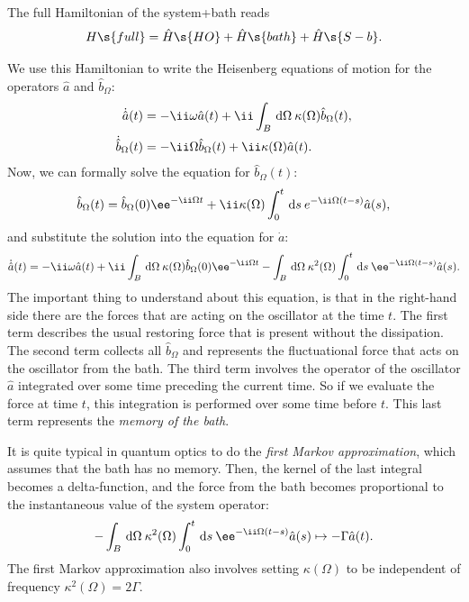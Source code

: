 \documentclass[fontsize=9pt,bookmarkpackage=false]{scrartcl}
\begin{document}
The full Hamiltonian of the system+bath reads
\begin{equation}
  H\s{full} = \hat H\s{HO} + \hat H \s{bath} + \hat H \s{S-b }.
\end{equation}

We use this Hamiltonian to write the Heisenberg equations of motion for the operators $\hat a$ and $\hat b_\Omega$:
\begin{align}
  \dot { \hat a } (t) & = - \ii \omega \hat a (t)
  + \ii \int_B \dl{ \Omega } \: \kappa ( \Omega ) \hat b_{\Omega} (t),
  \\
  \dot { \hat b } _\Omega (t) & = - \ii \Omega \hat b_\Omega (t) + \ii \kappa ( \Omega ) \hat a (t) .
\end{align}
Now, we can formally solve the equation for $\hat b_\Omega (t)$:
\begin{equation}
  \hat b_\Omega (t) = \hat b_\Omega (0) \ee^{ - \ii \Omega t }
  + \ii \kappa ( \Omega )
  \int_0^t \dl{s} \: e^{ - \ii \Omega ( t - s ) } \hat a (s),
\end{equation}
and substitute the solution into the equation for $\dot a$:
\begin{equation}
  \dot{ \hat a } (t) = - \ii \omega \hat a (t)
  +
  \ii \int_B \dl{ \Omega } \: \kappa ( \Omega ) \hat b_\Omega (0) \ee^{ - \ii \Omega t }
  - \int_ B \dl{ \Omega } \: \kappa^2 ( \Omega ) \int_0^t \dl{ s } \: \ee^{ - \ii \Omega ( t - s ) } \hat a (s).
\end{equation}
The important thing to understand about this equation, is that in the right-hand side there are the forces that are acting on the oscillator at the time $t$.
The first term describes the usual restoring force that is present without the dissipation.
The second term collects all $\hat b_\Omega$ and represents the fluctuational force that acts on the oscillator from the bath.
The third term involves the operator of the oscillator $\hat a$ integrated over some time preceding the current time.
So if we evaluate the force at time $t$, this integration is performed over some time before $t$.
This last term represents the \emph{memory of the bath}.

It is quite typical in quantum optics to do the \emph{first Markov approximation}, which assumes that the bath has no memory.
Then, the kernel of the last integral becomes a delta-function, and the force from the bath becomes proportional to the instantaneous value of the system operator:
\begin{equation}
  - \int_ B \dl{ \Omega } \: \kappa^2 ( \Omega ) \int_0^t \dl{ s } \: \ee^{ - \ii \Omega ( t - s ) } \hat a (s)
  \mapsto - \Gamma \hat a (t).
\end{equation}
The first Markov approximation also involves setting $\kappa(\Omega)$ to be independent of frequency $\kappa^2 (\Omega ) = 2 \Gamma$.
\end{document}
